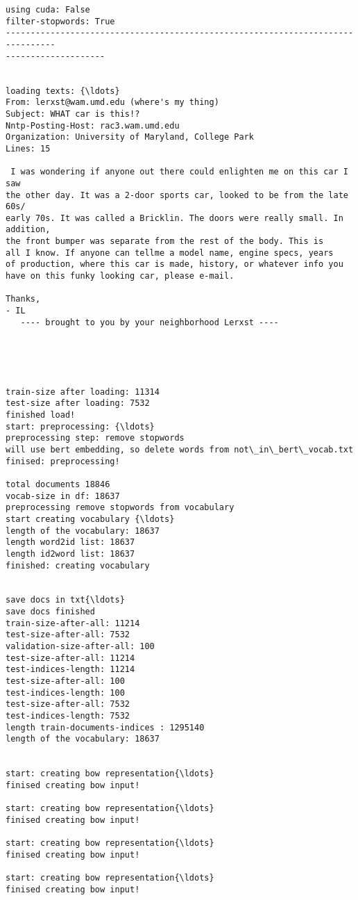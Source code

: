 \documentclass[11pt]{article}
\begin{document}
    \begin{Verbatim}[commandchars=\\\{\}]
using cuda: False
filter-stopwords: True
--------------------------------------------------------------------------------
--------------------


loading texts: {\ldots}
From: lerxst@wam.umd.edu (where's my thing)
Subject: WHAT car is this!?
Nntp-Posting-Host: rac3.wam.umd.edu
Organization: University of Maryland, College Park
Lines: 15

 I was wondering if anyone out there could enlighten me on this car I saw
the other day. It was a 2-door sports car, looked to be from the late 60s/
early 70s. It was called a Bricklin. The doors were really small. In addition,
the front bumper was separate from the rest of the body. This is
all I know. If anyone can tellme a model name, engine specs, years
of production, where this car is made, history, or whatever info you
have on this funky looking car, please e-mail.

Thanks,
- IL
   ---- brought to you by your neighborhood Lerxst ----





train-size after loading: 11314
test-size after loading: 7532
finished load!
start: preprocessing: {\ldots}
preprocessing step: remove stopwords
will use bert embedding, so delete words from not\_in\_bert\_vocab.txt
finised: preprocessing!

total documents 18846
vocab-size in df: 18637
preprocessing remove stopwords from vocabulary
start creating vocabulary {\ldots}
length of the vocabulary: 18637
length word2id list: 18637
length id2word list: 18637
finished: creating vocabulary


save docs in txt{\ldots}
save docs finished
train-size-after-all: 11214
test-size-after-all: 7532
validation-size-after-all: 100
test-size-after-all: 11214
test-indices-length: 11214
test-size-after-all: 100
test-indices-length: 100
test-size-after-all: 7532
test-indices-length: 7532
length train-documents-indices : 1295140
length of the vocabulary: 18637


start: creating bow representation{\ldots}
finised creating bow input!

start: creating bow representation{\ldots}
finised creating bow input!

start: creating bow representation{\ldots}
finised creating bow input!

start: creating bow representation{\ldots}
finised creating bow input!


\end{Verbatim}
\end{document}
